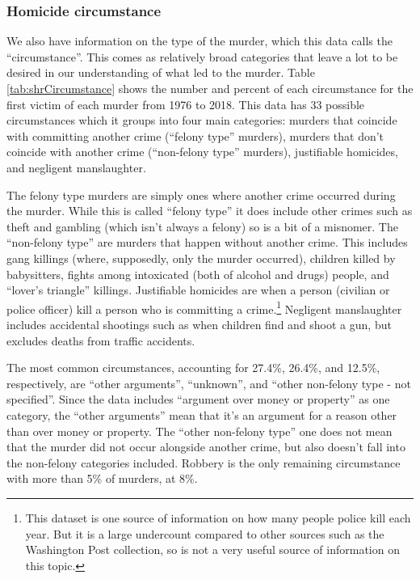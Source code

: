 \documentclass[
  12pt,
  openany]{book}
\begin{document}
\hypertarget{circumstance}{%
\subsubsection{Homicide circumstance}\label{circumstance}}

We also have information on the type of the murder, which this data calls the ``circumstance''. This comes as relatively broad categories that leave a lot to be desired in our understanding of what led to the murder. Table \ref{tab:shrCircumstance} shows the number and percent of each circumstance for the first victim of each murder from 1976 to 2018. This data has 33 possible circumstances which it groups into four main categories: murders that coincide with committing another crime (``felony type'' murders), murders that don't coincide with another crime (``non-felony type'' murders), justifiable homicides, and negligent manslaughter.

The felony type murders are simply ones where another crime occurred during the murder. While this is called ``felony type'' it does include other crimes such as theft and gambling (which isn't always a felony) so is a bit of a misnomer. The ``non-felony type'' are murders that happen without another crime. This includes gang killings (where, supposedly, only the murder occurred), children killed by babysitters, fights among intoxicated (both of alcohol and drugs) people, and ``lover's triangle'' killings. Justifiable homicides are when a person (civilian or police officer) kill a person who is committing a crime.\footnote{This dataset is one source of information on how many people police kill each year. But it is a large undercount compared to other sources such as the Washington Post collection, so is not a very useful source of information on this topic.} Negligent manslaughter includes accidental shootings such as when children find and shoot a gun, but excludes deaths from traffic accidents.

The most common circumstances, accounting for 27.4\%, 26.4\%, and 12.5\%, respectively, are ``other arguments'', ``unknown'', and ``other non-felony type - not specified''. Since the data includes ``argument over money or property'' as one category, the ``other arguments'' mean that it's an argument for a reason other than over money or property. The ``other non-felony type'' one does not mean that the murder did not occur alongside another crime, but also doesn't fall into the non-felony categories included. Robbery is the only remaining circumstance with more than 5\% of murders, at 8\%.
\end{document}
